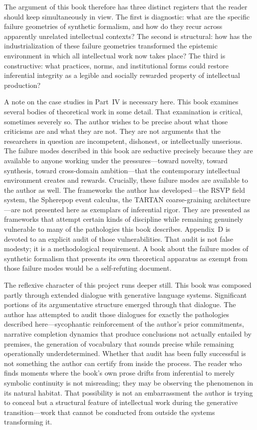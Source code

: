 \documentclass[12pt, openright, twoside]{book}
\begin{document}
The argument of this book therefore has three distinct registers that the reader
should keep simultaneously in view. The first is diagnostic: what are the specific
failure geometries of synthetic formalism, and how do they recur across apparently
unrelated intellectual contexts? The second is structural: how has the industrialization
of these failure geometries transformed the epistemic environment in which all
intellectual work now takes place? The third is constructive: what practices, norms,
and institutional forms could restore inferential integrity as a legible and
socially rewarded property of intellectual production?

A note on the case studies in Part~IV is necessary here. This book examines several
bodies of theoretical work in some detail. That examination is critical, sometimes
severely so. The author wishes to be precise about what those criticisms are and
what they are not. They are not arguments that the researchers in question are
incompetent, dishonest, or intellectually unserious. The failure modes described
in this book are seductive precisely because they are available to anyone working
under the pressures---toward novelty, toward synthesis, toward cross-domain
ambition---that the contemporary intellectual environment creates and rewards.
Crucially, these failure modes are available to the author as well. The frameworks
the author has developed---the RSVP field system, the Spherepop event calculus,
the TARTAN coarse-graining architecture---are not presented here as exemplars of
inferential rigor. They are presented as frameworks that attempt certain kinds of
discipline while remaining genuinely vulnerable to many of the pathologies this
book describes. Appendix~D is devoted to an explicit audit of those vulnerabilities.
That audit is not false modesty; it is a methodological requirement. A book about
the failure modes of synthetic formalism that presents its own theoretical apparatus
as exempt from those failure modes would be a self-refuting document.

The reflexive character of this project runs deeper still. This book was composed
partly through extended dialogue with generative language systems. Significant
portions of its argumentative structure emerged through that dialogue. The author
has attempted to audit those dialogues for exactly the pathologies described
here---sycophantic reinforcement of the author's prior commitments, narrative
completion dynamics that produce conclusions not actually entailed by premises,
the generation of vocabulary that sounds precise while remaining operationally
underdetermined. Whether that audit has been fully successful is not something the
author can certify from inside the process. The reader who finds moments where
the book's own prose drifts from inferential to merely symbolic continuity is
not misreading; they may be observing the phenomenon in its natural habitat.
That possibility is not an embarrassment the author is trying to conceal but a
structural feature of intellectual work during the generative transition---work
that cannot be conducted from outside the systems transforming it.
\end{document}
